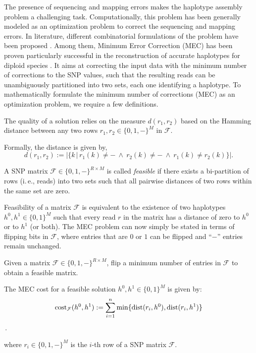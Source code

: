 The presence of sequencing and mapping errors makes the haplotype assembly problem a challenging task. 
Computationally, this problem has been generally modeled as an optimization problem to correct the sequencing and mapping errors.
In literature, different combinatorial formulations of the problem have been
proposed \citep{lippert2002algorithmic}. Among them, Minimum Error Correction (MEC) \citep{lippert2002algorithmic} has
been proven particularly successful in the reconstruction of accurate haplotypes for
diploid species \citep{martin2016whatshap, he2010optimal, CDW13_exact, Glusman2014}. It aims at correcting the input data with the minimum
number of corrections to the SNP values, such that the resulting reads can be unambiguously partitioned into two sets, each one identifying a haplotype. 
To mathematically formulate the minimum number of corrections (MEC) as an optimization problem, we require a few definitions.

The quality of a solution relies on the measure $d(r_1,r_2)$ based on the Hamming distance between any two rows $r_1,r_2\in\{0,1, -\}^M$ in $\mathcal{F}$.
\begin{definition}[Distance] 
 Formally, the distance is given by,
\[d(r_1,r_2):= \big|\big\{k\,\big|\,r_1(k)\neq -\ \wedge\ r_2(k)\neq -\ \wedge\ r_1(k)\neq r_2(k)\big\}\big|.\]
\label{eq:distance}
\end{definition}

\begin{definition}[Feasibility]
A SNP matrix $\mathcal{F}\in\{0,1,-\}^{R\times M}$ is called \emph{feasible} if there exists a bi-partition of rows (i.\,e., reads) into two sets such that all pairwise distances of two rows within the same set are zero.
\label{def:feasible-mec}
\end{definition}
Feasibility of a matrix $\mathcal{F}$ is equivalent to the existence of two haplotypes $h^0,h^1\in\{0,1\}^M$ such that every read $r$ in the matrix has a distance of zero to $h^0$ or to $h^1$ (or both).
The MEC problem can now simply be stated in terms of flipping bits in $\mathcal{F}$, where entries that are $0$ or $1$ can be flipped and ``$-$'' entries remain unchanged.

\begin{problem}[MEC]
Given a matrix $\mathcal{F}\in\{0,1,-\}^{R\times M}$, flip a minimum number of entries in $\mathcal{F}$ to obtain a feasible matrix.
\label{prob:mec}
\end{problem}


\begin{definition}
The MEC cost for a feasible solution $h^0,h^1\in\{0,1\}^M$ is given by: \\
    \[\mathrm{cost}_{\mathcal{F}}(h^0,h^1) := \sum_{i=1}^{n} \min\{\mathrm{dist}(r_i,h^0), \mathrm{dist}(r_i,h^1)\}\]\,.

where $r_i \in \{0,1, -\}^M$ is the $i$-th row of a SNP matrix $\mathcal{F}$.
\label{eq:cost}
\end{definition}


